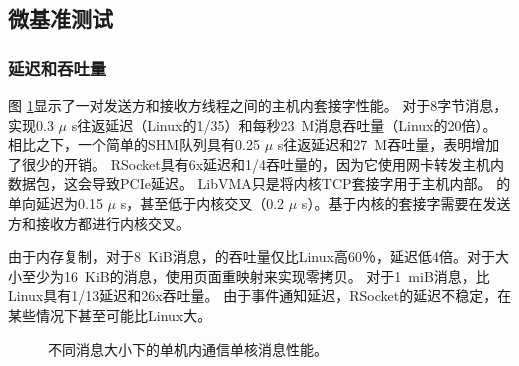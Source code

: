 \subsection{微基准测试}
\label{socksdirect:subsec:microbenchmark}

\subsubsection{延迟和吞吐量}



图 \ref {socksdirect:fig:eval-msgsize-intra}显示了一对发送方和接收方线程之间的主机内套接字性能。
对于8字节消息，\sys 实现0.3 $ \mu $ s往返延迟（Linux的1/35）和每秒23~M消息吞吐量（Linux的20倍）。
相比之下，一个简单的SHM队列具有0.25 $ \mu $ s往返延迟和27~M吞吐量，表明\sys 增加了很少的开销。
RSocket具有6x延迟和1/4吞吐量的\sys  {}，因为它使用网卡转发主机内数据包，这会导致PCIe延迟。
LibVMA只是将内核TCP套接字用于主机内部。
\sys  {}的单向延迟为0.15 $ \mu $ s，甚至低于内核交叉（0.2 $ \mu $ s）。基于内核的套接字需要在发送方和接收方都进行内核交叉。


由于内存复制，对于8~KiB消息，\sys 的吞吐量仅比Linux高60％，延迟低4倍。对于大小至少为16~KiB的消息，\sys 使用页面重映射来实现零拷贝。
对于1~miB消息，\sys 比Linux具有1/13延迟和26x吞吐量。
由于事件通知延迟，RSocket的延迟不稳定，在某些情况下甚至可能比Linux大。



\begin{figure}[htbp]
	\centering
	
	\caption{不同消息大小下的单机内通信单核消息性能。}
	\label{socksdirect:fig:eval-msgsize-intra}
\end{figure}


